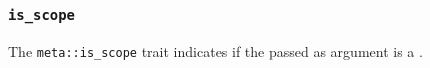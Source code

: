 
\subsubsection{\texttt{is\_scope}}

The \texttt{meta::is\_scope}
trait indicates if the  passed as argument is a .


